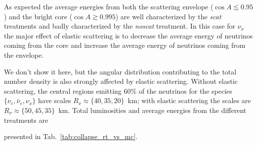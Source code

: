 \documentclass[aps,floatfix,prd,superscriptaddress,twocolumn]{revtex4-1}
\newcommand{\todo}[1]{\marginpar{\tiny{\textcolor{red}{#1}}}}
\renewcommand\todo[1]{} %
\begin{document}
As expected the average energies from both
the scattering envelope ($\cos A \lesssim 0.95$) and
the bright core ($\cos A\gtrsim 0.995 $)
are well characterized by the \emph{scat} treatments
and badly characterized by the \emph{noscat} treatment.
In this case for $\nu_x$ the major effect of elastic scattering
is to decrease the average energy of neutrinos coming from the core
and increase the average energy of neutrinos coming from the envelope.

We don't show it here, but the angular distribution contributing to the
total number density is also strongly affected by elastic scattering.
Without elastic scattering, the central regions emitting 60\%
of the neutrinos for the species $\{\nu_e,\bar{\nu}_e,\nu_x\}$
have scales $R_\nu\approx\{40,35,20\}$~km;
with elastic scattering the scales are
$R_\nu\approx\{50,45,35\}$~km.
Total luminosities and average energies from the different treatments are
\todo{update MC results 02->03}
presented in Tab.~\ref{tab:collapse_rt_vs_mc}.
\end{document}
